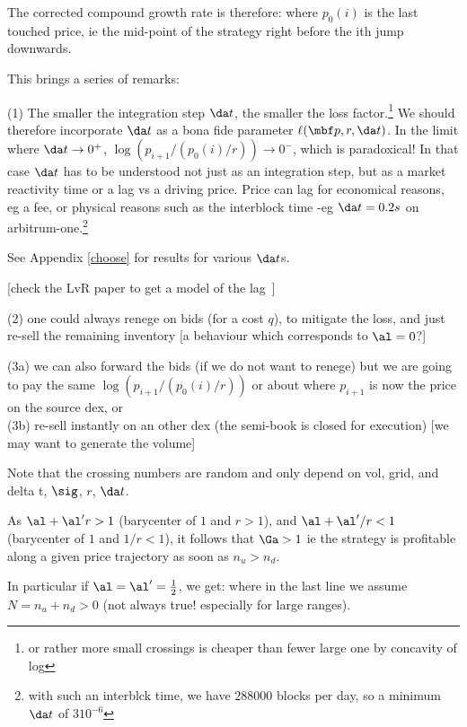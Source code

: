 \documentclass[oneside,twocolumn,12pt]{article}
\begin{document}
The corrected compound growth rate is therefore:
where $p_0(i)$ is the last touched price, ie the mid-point of the strategy right before the
ith jump downwards.

This brings a series of remarks:

(1) The smaller the integration step $\da t$, the smaller the loss factor.\footnote{or rather
more small crossings is cheaper than fewer large one by concavity of log}
We should therefore incorporate $\da t$ as a bona fide parameter $\ell(\mbf p, r,\da t)$.
In the limit where $\da t\to0^+$, $\log(p_{i+1}/(p_0(i)/r))\to 0^-$, which is paradoxical!
In that case $\da t$ has to be understood not just as an integration step,
but as a market reactivity time or a lag vs a driving price. Price can lag for economical reasons,
eg a fee, or physical reasons such as the interblock time -eg $\da t=0.2s$ on arbitrum-one.\footnote{
with such an interblck time, we have $288000$ blocks per day, so a minimum $\da t$ of $310^{-6}$}

See Appendix \ref{choose} for results for various $\da t$s.

[check the LvR paper to get a model of the lag~\cite{milionis2022automated}]

(2) one could always renege on bids (for a cost $q$), to mitigate the loss, 
and just re-sell the remaining inventory [a behaviour which corresponds to $\al=0$?]

(3a) we can also forward the bids (if we do not want to renege) but we are going to pay the same
$\log(p_{i+1}/(p_0(i)/r))$ or about where $p_{i+1}$ is now the price on the source dex, or 
\\(3b) re-sell instantly on an other dex (the semi-book is closed for execution) 
[we may want to generate the volume]


Note that the crossing numbers are random and only depend on vol, grid, and delta t, $\sig$, $r$, $\da t$.


As
$\al+\al' r>1$ (barycenter of $1$ and $r>1$), and  
$\al+\al'/r<1$ (barycenter of $1$ and $1/r<1$),
it follows that $\Ga>1$ ie the strategy is profitable along a given price trajectory as soon as $n_u>n_d$.

In particular if $\al=\al'=\frac12$, we get:
where in the last line we assume $N=n_u+n_d>0$ (not always true! especially for large ranges).
\end{document}
